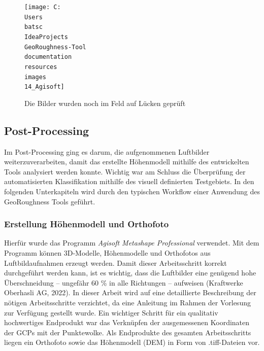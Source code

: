 \documentclass[12pt]{article}
\begin{document}
        \begin{figure}
            \centering
            \texttt{[image: C:\\Users\\batsc\\IdeaProjects\\GeoRoughness-Tool\\documentation\\resources\\images\\14\_Agisoft]}
            \caption{Die Bilder wurden noch im Feld auf Lücken geprüft}
            \label{fig:14_agisoft}
        \end{figure}

    \subsection{Post-Processing}\label{subsec:post-processing}
        Im Post-Processing ging es darum, die aufgenommenen Luftbilder weiterzuverarbeiten, damit das erstellte Höhenmodell mithilfe des entwickelten Tools analysiert werden konnte. 
        Wichtig war am Schluss die Überprüfung der automatisierten Klassifikation mithilfe des visuell definierten Testgebiets. 
        In den folgenden Unterkapiteln wird durch den typischen Workflow einer Anwendung des GeoRoughness Tools geführt.

        \subsubsection{Erstellung Höhenmodell und Orthofoto}\label{subsubsec:erstellung-hoehenmodell-und-orthofoto}

            Hierfür wurde das Programm \textit{Agisoft Metashape Professional} verwendet.
            Mit dem Programm können 3D-Modelle, Höhenmodelle und Orthofotos aus Luftbildaufnahmen erzeugt werden.
            Damit dieser Arbeitsschritt korrekt durchgeführt werden kann, ist es wichtig, dass die Luftbilder eine genügend hohe Überschneidung – ungefähr 60 \% in alle Richtungen – aufweisen (Kraftwerke Oberhasli AG, 2022). %
            In dieser Arbeit wird auf eine detaillierte Beschreibung der nötigen Arbeitsschritte verzichtet, da eine Anleitung im Rahmen der Vorlesung zur Verfügung gestellt wurde.
            Ein wichtiger Schritt für ein qualitativ hochwertiges Endprodukt war das Verknüpfen der ausgemessenen Koordinaten der GCPs mit der Punktewolke.
            Als Endprodukte des gesamten Arbeitsschritts liegen ein Orthofoto sowie das Höhenmodell (DEM) in Form von .tiff-Dateien vor. %
\end{document}
